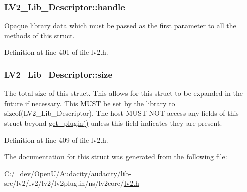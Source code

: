 \subsubsection[{\texorpdfstring{handle}{handle}}]{ L\+V2\+\_\+\+Lib\+\_\+\+Descriptor\+::handle}\hypertarget{struct_l_v2___lib___descriptor_a7b1ff54c9aee9c7316df940fda237b4a}{}\label{struct_l_v2___lib___descriptor_a7b1ff54c9aee9c7316df940fda237b4a}
Opaque library data which must be passed as the first parameter to all the methods of this struct. 

Definition at line 401 of file lv2.\+h.

\subsubsection[{\texorpdfstring{size}{size}}]{ L\+V2\+\_\+\+Lib\+\_\+\+Descriptor\+::size}\hypertarget{struct_l_v2___lib___descriptor_a4dc5b75a470b8d3c595d5e7621898e7d}{}\label{struct_l_v2___lib___descriptor_a4dc5b75a470b8d3c595d5e7621898e7d}
The total size of this struct. This allows for this struct to be expanded in the future if necessary. This M\+U\+ST be set by the library to sizeof(\+L\+V2\+\_\+\+Lib\+\_\+\+Descriptor). The host M\+U\+ST N\+OT access any fields of this struct beyond \hyperlink{struct_l_v2___lib___descriptor_a6c29de06901b337df58d9e95b94c95fb}{get\+\_\+plugin()} unless this field indicates they are present. 

Definition at line 409 of file lv2.\+h.



The documentation for this struct was generated from the following file\+:\begin{DoxyCompactItemize}
\item 
C\+:/\+\_\+dev/\+Open\+U/\+Audacity/audacity/lib-\/src/lv2/lv2/lv2/lv2plug.\+in/ns/lv2core/\hyperlink{lv2_8h}{lv2.\+h}\end{DoxyCompactItemize}

